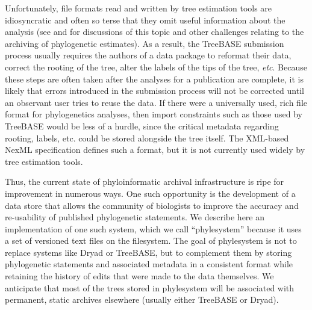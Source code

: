 \documentclass{bioinfo}
\newcommand{\ps}{phylesystem\xspace}
\begin{document}
Unfortunately, file formats read and written by tree estimation tools are idiosyncratic and often so 
    terse that they omit useful information about the analysis (see \citet{StoltzfusEtAl2012} and \citet{Cranston2014} for discussions
    of this topic and other challenges relating to the archiving of phylogenetic estimates).
As a result, the TreeBASE submission process usually requires the authors of a data package to reformat their data, correct
    the rooting of the tree, alter the labels of the tips of the tree, {\em etc}.
Because these steps are often taken after the analyses for a publication are complete, it is likely that
    errors introduced in the submission process will not be corrected until an observant user tries to reuse the data.
If there were a universally used, rich file format for phylogenetics analyses, then import constraints such as those
    used by TreeBASE would be less of a hurdle, since the critical metadata regarding rooting, labels, etc. could be
    stored alongside the tree itself.
The XML-based NexML specification \citep{NeXML} defines such a format, but it is not currently  used widely by tree estimation tools.


Thus, the current state of phyloinformatic archival infrastructure is ripe for improvement in numerous ways.
One such opportunity is the development of a data store that allows the community of biologists to improve the
    accuracy and re-usability of published phylogenetic statements.
We describe here an implementation of one such system, which we call ``\ps'' because it uses a set of
    versioned text files on the filesystem. %
The goal of \ps is not to replace systems like Dryad or TreeBASE, but to complement them by 
    storing phylogenetic statements and associated metadata in a consistent format while retaining the history of
    edits that were made to the data themselves.
We anticipate that most of the trees stored in \ps will be associated with permanent, static archives
    elsewhere (usually either TreeBASE or Dryad).
\end{document}
